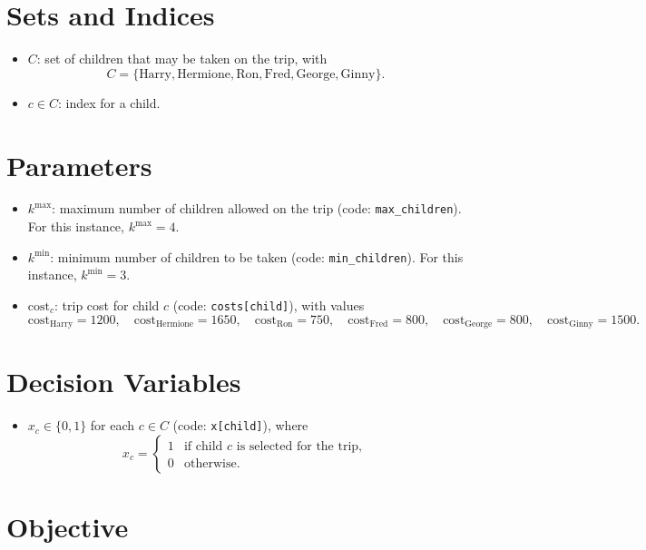 \section*{Sets and Indices}

\begin{itemize}
    \item $C$: set of children that may be taken on the trip, with
    \[
    C=\{\text{Harry},\text{Hermione},\text{Ron},\text{Fred},\text{George},\text{Ginny}\}.
    \]
    \item $c \in C$: index for a child.
\end{itemize}

\section*{Parameters}

\begin{itemize}
    \item $k^{\max}$: maximum number of children allowed on the trip (code: \texttt{max\_children}). For this instance, $k^{\max}=4$.
    \item $k^{\min}$: minimum number of children to be taken (code: \texttt{min\_children}). For this instance, $k^{\min}=3$.
    \item $\mathrm{cost}_c$: trip cost for child $c$ (code: \texttt{costs[child]}), with values
    \[
    \mathrm{cost}_{\text{Harry}}=1200,\quad
    \mathrm{cost}_{\text{Hermione}}=1650,\quad
    \mathrm{cost}_{\text{Ron}}=750,\quad
    \mathrm{cost}_{\text{Fred}}=800,\quad
    \mathrm{cost}_{\text{George}}=800,\quad
    \mathrm{cost}_{\text{Ginny}}=1500.
    \]
\end{itemize}

\section*{Decision Variables}

\begin{itemize}
    \item $x_c \in \{0,1\}$ for each $c \in C$ (code: \texttt{x[child]}), where
    \[
    x_c=
    \begin{cases}
    1 & \text{if child } c \text{ is selected for the trip},\\
    0 & \text{otherwise.}
    \end{cases}
    \]
\end{itemize}

\section*{Objective}

